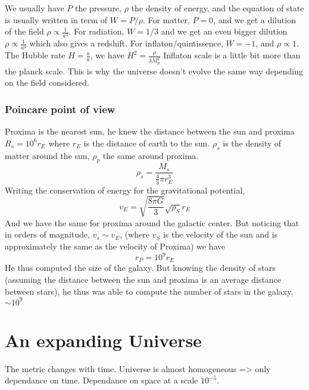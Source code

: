 \documentclass[a4paper]{book}
\theoremstyle{definition}
\theoremstyle{remark}
\begin{document}
We usually have $P$ the pressure, $\rho$ the density of energy, and the equation of state is usually written in term of $W = P/\rho$. For matter, $P=0$, and we get a dilution of the field $\rho \propto \frac{1}{a^3}$. For radiation, $W = 1/3$ and we get an even bigger dilution $\rho \propto \frac{1}{a^4}$ which also gives a redshift. For inflaton/quintissence, $W=-1$, and $\rho \propto 1$. The Hubble rate $H=\frac{\dot{a}}{a}$, we have $H^2 = \frac{\rho}{3 M_p^2}$
Inflaton scale is a little bit more than the planck scale. This is why the universe doesn't evolve the same way depending on the field considered. 

\subsection{Poincare point of view}

Proxima is the nearest sun, he knew the distance between the sun and proxima $R_s = 10^6 r_E$ where $r_E$ is the distance of earth to the sun. $\rho_s$ is the density of matter around the sun, $\rho_p$ the same around proxima. 
\begin{equation}
    \rho_s = \frac{M_s}{\frac{4}{3}\pi r_E^3}
\end{equation}
Writing the conservation of energy for the gravitational potential,
\begin{equation}
    v_E = \sqrt{\frac{8\pi G}{3}}\sqrt{\rho_S}r_E
\end{equation}
And we have the same for proxima around the galactic center. But noticing that in orders of magnitude, $v_s \sim v_E$, (where $v_S$ is the velocity of the sun and is approximately the same as the velocity of Proxima) we have 
\begin{equation}
    r_P = 10^9 r_E
\end{equation}
He thus computed the size of the galaxy. But knowing the density of stars (assuming the distance between the sun and proxima is an average distance between stars), he thus was able to compute the number of stars in the galaxy, $\sim 10^9$

\chapter{An expanding Universe}

The metric changes with time. Universe is almost homogeneous => only dependance on time. Dependance on space at a scale $10^{-5}$.
\end{document}
